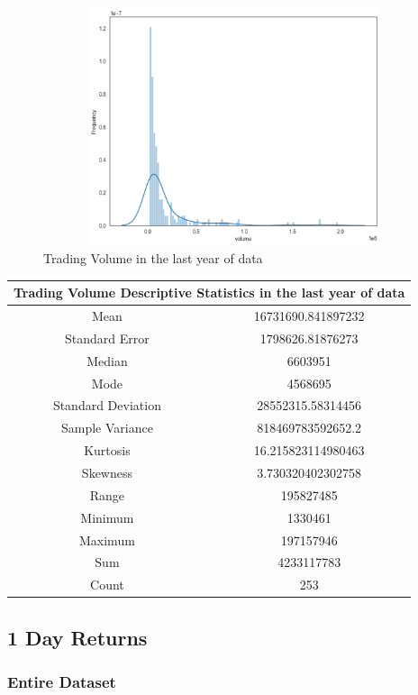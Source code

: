 \begin{figure}[h!]
    \centering
    \includegraphics[width=15cm,height=7cm,keepaspectratio]{resultsEvaluation/volumeDesc1.png}
    \caption{Trading Volume in the last year of data}
    \label{fig:appendix_volumeDesc1}
\end{figure}
\begin{center}
\begin{tabular}{ c c }
\hline
\multicolumn{2}{|c|}{Trading Volume Descriptive Statistics in the last year of data} \\
\hline
Mean & 16731690.841897232 \\
Standard Error & 1798626.81876273 \\
Median & 6603951 \\
Mode & 4568695 \\
Standard Deviation & 28552315.58314456 \\
Sample Variance & 818469783592652.2 \\
Kurtosis & 16.215823114980463 \\
Skewness & 3.730320402302758 \\
Range & 195827485 \\
Minimum & 1330461 \\
Maximum & 197157946 \\
Sum & 4233117783 \\
Count & 253
\end{tabular}
\end{center}

\subsection{1 Day Returns}

\subsubsection{Entire Dataset}

